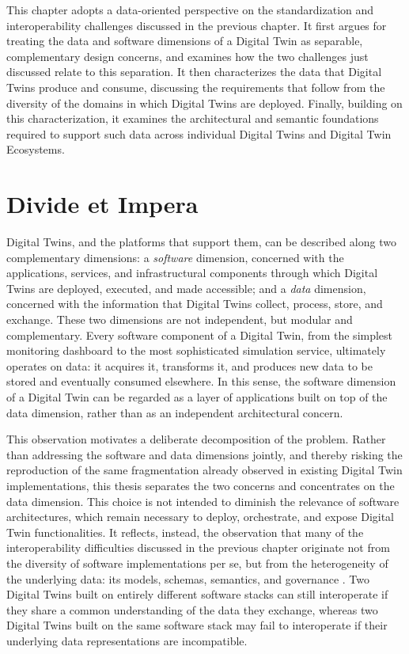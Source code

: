 This chapter adopts a data-oriented perspective on the standardization and interoperability challenges discussed in the previous chapter. It first argues for treating the data and software dimensions of a Digital Twin as separable, complementary design concerns, and examines how the two challenges just discussed relate to this separation. It then characterizes the data that Digital Twins produce and consume, discussing the requirements that follow from the diversity of the domains in which Digital Twins are deployed. Finally, building on this characterization, it examines the architectural and semantic foundations required to support such data across individual Digital Twins and Digital Twin Ecosystems.

\section{Divide et Impera}

Digital Twins, and the platforms that support them, can be described along two complementary dimensions: a \textit{software} dimension, concerned with the applications, services, and infrastructural components through which Digital Twins are deployed, executed, and made accessible; and a \textit{data} dimension, concerned with the information that Digital Twins collect, process, store, and exchange. These two dimensions are not independent, but modular and complementary. Every software component of a Digital Twin, from the simplest monitoring dashboard to the most sophisticated simulation service, ultimately operates on data: it acquires it, transforms it, and produces new data to be stored and eventually consumed elsewhere. In this sense, the software dimension of a Digital Twin can be regarded as a layer of applications built on top of the data dimension, rather than as an independent architectural concern.

This observation motivates a deliberate decomposition of the problem. Rather than addressing the software and data dimensions jointly, and thereby risking the reproduction of the same fragmentation already observed in existing Digital Twin implementations, this thesis separates the two concerns and concentrates on the data dimension. This choice is not intended to diminish the relevance of software architectures, which remain necessary to deploy, orchestrate, and expose Digital Twin functionalities. It reflects, instead, the observation that many of the interoperability difficulties discussed in the previous chapter originate not from the diversity of software implementations per se, but from the heterogeneity of the underlying data: its models, schemas, semantics, and governance \cite{acharya2024interoperability,david2024interoperability}. Two Digital Twins built on entirely different software stacks can still interoperate if they share a common understanding of the data they exchange, whereas two Digital Twins built on the same software stack may fail to interoperate if their underlying data representations are incompatible.

